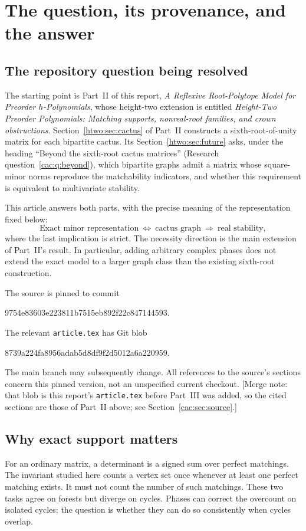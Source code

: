 \documentclass[11pt]{article}
\numberwithin{equation}{section}
\theoremstyle{definition}
\begin{document}
\section{The question, its provenance, and the answer}
\label{cac:sec:intro}

\subsection{The repository question being resolved}
The starting point is Part~II of this report, \emph{A Reflexive Root-Polytope Model for Preorder $h$-Polynomials}, whose height-two extension is entitled \emph{Height-Two Preorder Polynomials: Matching supports, nonreal-root families, and crown obstructions}. Section~\ref{htwo:sec:cactus} of Part~II constructs a sixth-root-of-unity matrix for each bipartite cactus. Its Section~\ref{htwo:sec:future} asks, under the heading ``Beyond the sixth-root cactus matrices'' (Research question~\ref{cac:q:beyond}), which bipartite graphs admit a matrix whose square-minor norms reproduce the matchability indicators, and whether this requirement is equivalent to multivariate stability.

This article answers both parts, with the precise meaning of the representation fixed below:
\[
 \boxed{\text{Exact minor representation}\ \Longleftrightarrow\
        \text{cactus graph}\ \Longrightarrow\ \text{real stability},}
\]
where the last implication is strict. The necessity direction is the main extension of Part~II's result. In particular, adding arbitrary complex phases does not extend the exact model to a larger graph class than the existing sixth-root construction.

The source is pinned to commit
\begin{center}\small\ttfamily 9754e83603e223811b7515eb892f22c847144593.\end{center}
The relevant \texttt{article.tex} has Git blob
\begin{center}\small\ttfamily 8739a224fa8956adab5d8df9f2d5012a6a220959.\end{center}
The main branch may subsequently change. All references to the source's sections concern this pinned version, not an unspecified current checkout. [Merge note: that blob is this report's \texttt{article.tex} before Part~III was added, so the cited sections are those of Part~II above; see Section~\ref{cac:sec:source}.]

\subsection{Why exact support matters}
For an ordinary matrix, a determinant is a signed sum over perfect matchings. The invariant studied here counts a vertex set once whenever at least one perfect matching exists. It must not count the number of such matchings. These two tasks agree on forests but diverge on cycles. Phases can correct the overcount on isolated cycles; the question is whether they can do so consistently when cycles overlap.
\end{document}

